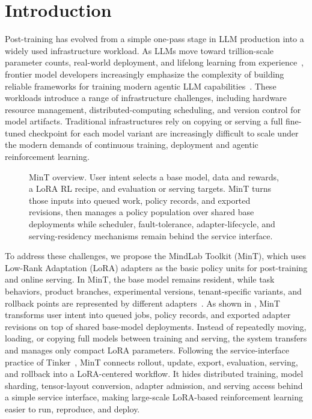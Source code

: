 \section{Introduction}

Post-training has evolved from a simple one-pass stage in LLM production into a widely used infrastructure workload. As LLMs move toward trillion-scale parameter counts, real-world deployment, and lifelong learning from experience~\citep{yao_second_half_2025,silver_sutton_experience_2025}, frontier model developers increasingly emphasize the complexity of building reliable frameworks for training modern agentic LLM capabilities~\citep{deepseek_v4_release_2026,deepseekv4_2026,glm5_2026,kimi_k25_2026,minimax_m27_2026,qwen35_2026,openai_gpt55_2026,anthropic_opus45_2025}. These workloads introduce a range of infrastructure challenges, including hardware resource management, distributed-computing scheduling, and version control for model artifacts. Traditional infrastructures rely on copying or serving a full fine-tuned checkpoint for each model variant are increasingly difficult to scale under the modern demands of continuous training, deployment and agentic reinforcement learning.


\begin{figure}[H]
    \centering
    \resizebox{\textwidth}{!}{}
    \caption{MinT overview. User intent selects a base model, data and rewards, a LoRA RL recipe, and evaluation or serving targets. MinT turns those inputs into queued work, policy records, and exported revisions, then manages a policy population over shared base deployments while scheduler, fault-tolerance, adapter-lifecycle, and serving-residency mechanisms remain behind the service interface.}
    \label{fig:mint_overview}
\end{figure}

To address these challenges, we propose the MindLab Toolkit (MinT), which uses Low-Rank Adaptation (LoRA) adapters as the basic policy units for post-training and online serving. In MinT, the base model remains resident, while task behaviors, product branches, experimental versions, tenant-specific variants, and rollback points are represented by different adapters~\citep{lora2022,lora_without_regret_2025}. As shown in , MinT transforms user intent into queued jobs, policy records, and exported adapter revisions on top of shared base-model deployments. Instead of repeatedly moving, loading, or copying full models between training and serving, the system transfers and manages only compact LoRA parameters. Following the service-interface practice of Tinker~\citep{tinker2025,tinker_cookbook}, MinT connects rollout, update, export, evaluation, serving, and rollback into a LoRA-centered workflow. It hides distributed training, model sharding, tensor-layout conversion, adapter admission, and serving access behind a simple service interface, making large-scale LoRA-based reinforcement learning easier to run, reproduce, and deploy.

